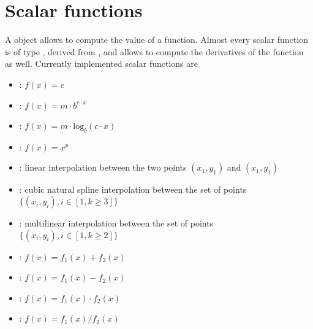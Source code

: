 %
%
%
%
%
% 
%
%

\section{Scalar functions}\label{sec:SCALARFUNCS}
A  object allows to compute the value of a function.
Almost every scalar function is of type ,
derived from , and allows to compute the derivatives of
the function as well. Currently implemented scalar functions are
\begin{itemize}
\item {}: $f(x)=c$
\item {}: $f(x)=m\cdot b^{c\cdot{x}}$
\item {}: $f(x)=m\cdot\textrm{log}_b(c\cdot{x})$
\item {}: $f(x)=x^p$
\item {}: linear interpolation between the two points $(x_1,y_1)$
and $(x_1,y_1)$
\item {}: cubic natural spline interpolation between the 
set of points $\{(x_i,y_i), i\in[1,k\geq3]\}$
\item {}: multilinear interpolation between the 
set of points $\{(x_i,y_i), i\in[1,k\geq2]\}$
\item {}: $f(x)=f_1(x) + f_2(x)$
\item {}: $f(x)=f_1(x) - f_2(x)$
\item {}: $f(x)=f_1(x) \cdot f_2(x)$
\item {}: $f(x)=f_1(x) / f_2(x)$
\end{itemize}

